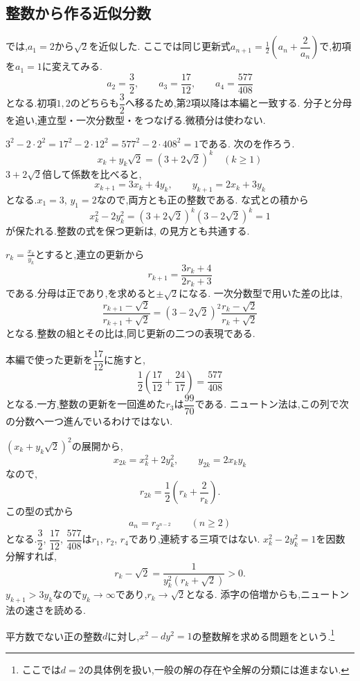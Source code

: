 \subsection{整数から作る近似分数}\label{節：整数から作る近似分数}
では,$a_1=2$から$\sqrt2$を近似した.
ここでは同じ更新式$a_{n+1}=\frac12\left(a_n+\dfrac{2}{a_n}\right)$で,初項を$a_1=1$に変えてみる.
\[
  a_2=\frac32,\qquad a_3=\frac{17}{12},\qquad a_4=\frac{577}{408}
\]
となる.初項$1,2$のどちらも$\dfrac{3}{2}$へ移るため,第2項以降は本編と一致する.
分子と分母を追い,連立型・一次分数型・をつなげる.微積分は使わない.

$3^2-2\cdot2^2=17^2-2\cdot12^2=577^2-2\cdot408^2=1$である.
次のを作ろう.
\[
  x_k+y_k\sqrt2=(3+2\sqrt2)^k\quad(k\ge1)
\]
$3+2\sqrt2$倍して係数を比べると,
\[
  x_{k+1}=3x_k+4y_k,\qquad y_{k+1}=2x_k+3y_k
\]
となる.$x_1=3$, $y_1=2$なので,両方とも正の整数である.
な式との積から
\[
  x_k^2-2y_k^2=(3+2\sqrt2)^k(3-2\sqrt2)^k=1
\]
が保たれる.整数の式を保つ更新は,
の見方とも共通する.

$r_k=\frac{x_k}{y_k}$とすると,連立の更新から
\[
  r_{k+1}=\frac{3r_k+4}{2r_k+3}
\]
である.分母は正であり,を求めると$\pm\sqrt2$になる.
一次分数型で用いた差の比は,
\[
  \frac{r_{k+1}-\sqrt2}{r_{k+1}+\sqrt2}
  =(3-2\sqrt2)^2
  \frac{r_k-\sqrt2}{r_k+\sqrt2}
\]
となる.整数の組とその比は,同じ更新の二つの表現である.

本編で使った更新を$\dfrac{17}{12}$に施すと,
\[
  \frac12\left(\frac{17}{12}+\frac{24}{17}\right)=\frac{577}{408}
\]
となる.一方,整数の更新を一回進めた$r_3$は$\dfrac{99}{70}$である.
ニュートン法は,この列で次の分数へ一つ進んでいるわけではない.

$(x_k+y_k\sqrt2)^2$の展開から,
\[
  x_{2k}=x_k^2+2y_k^2,\qquad y_{2k}=2x_ky_k
\]
なので,
\[
  r_{2k}=\frac12\left(r_k+\frac2{r_k}\right).
\]
この型の式から
\[
  a_n=r_{2^{n-2}}\qquad(n\ge2)
\]
となる.$\dfrac{3}{2}$, $\dfrac{17}{12}$, $\dfrac{577}{408}$は$r_1$, $r_2$, $r_4$であり,連続する三項ではない.
\BookFigPellDoubling
$x_k^2-2y_k^2=1$を因数分解すれば,
\[
  r_k-\sqrt2=\frac1{y_k^2(r_k+\sqrt2)}>0.
\]
$y_{k+1}>3y_k$なので$y_k\to\infty$であり,$r_k\to\sqrt2$となる.
添字の倍増からも,ニュートン法の速さを読める.

平方数でない正の整数$d$に対し,$x^2-dy^2=1$の整数解を求める問題を\textbf{}という.\footnote{ここでは$d=2$の具体例を扱い,一般の解の存在や全解の分類には進まない.}

